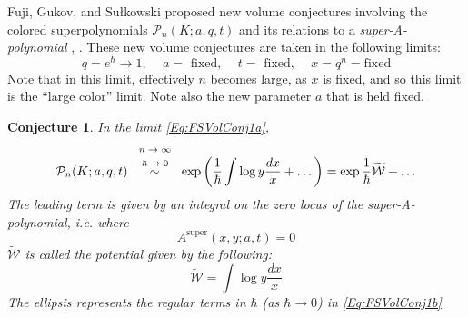 \documentclass[a4paper,titlepage,twoside]{book}
\newtheorem{conjecture}{Conjecture}
\begin{document}
Fuji, Gukov, and Su\l kowski proposed new volume conjectures involving the colored superpolynomials $\mathcal{P}_n{(K;a,q,t)}$ and its relations to a \emph{super-A-polynomial} \cite{bib:FGS2012}, \cite{FujiSulkowski2013}.  These new volume conjectures are taken in the following limits:
\begin{equation}
  q = e^{\hbar} \to 1, \quad \, a = \text{ fixed}, \quad \, t = \text{ fixed}, \quad \, x = q^n = \text{fixed} \label{Eq:FSVolConj1a}
\end{equation}
Note that in this limit, effectively $n$ becomes large, as $x$ is fixed, and so this limit is the ``large color'' limit.  Note also the new parameter $a$ that is held fixed.  

\begin{conjecture}%
 In the limit \eqref{Eq:FSVolConj1a},
\begin{equation} 
  \mathcal{P}_n(K;a,q,t) \overset{ \mbox{ \scriptsize{  $\begin{gathered} n\to \infty \\ \hbar \to 0 \end{gathered}$ } }  }{ \sim } \exp{ \left( \frac{1}{ \hbar } \int \log{ y } \frac{dx}{ x } + \dots \right) } = \exp{ \frac{1}{\hbar} \widetilde{ \mathcal{ W } } + \dots  } \label{Eq:FSVolConj1b}
\end{equation}
The leading term is given by an integral on the zero locus of the super-A-polynomial, i.e. where 
\begin{equation}
  A^{\text{super}}(x,y;a,t) = 0 \label{Eq:FSVolConj1c}
\end{equation}
$\widetilde{ \mathcal{W} }$ is called the potential given by the following:
\begin{equation}
\widetilde{ \mathcal{W}} = \int \log{y} \frac{dx}{x}   \label{Eq:potentialW00}
\end{equation}
The ellipsis represents the regular terms in $\hbar$ (as $\hbar \to 0$) in \eqref{Eq:FSVolConj1b}
\end{conjecture}
\end{document}
